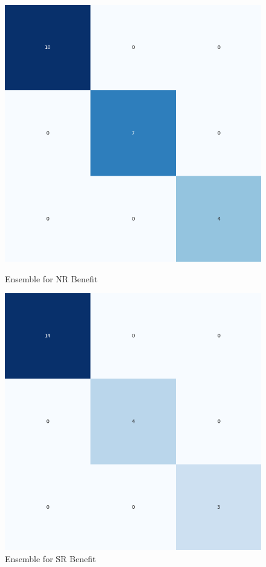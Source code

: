 \begin{figure}[H]
    \centering
    \begin{minipage}[b]{0.45\textwidth}
        \includegraphics[width=\textwidth]{./class_specific_section/ensemble_plots/ensemble_confusion_matrix_NR_Benefit.png}
        \caption{Ensemble for NR Benefit}
        \label{fig_class:spec_ensemble_nr_benefit}
    \end{minipage}
    \hfill
    \begin{minipage}[b]{0.45\textwidth}
        \includegraphics[width=\textwidth]{./class_specific_section/ensemble_plots/ensemble_confusion_matrix_SR_Benefit.png}
        \caption{Ensemble for SR Benefit}
        \label{fig_class:spec_ensemble_sr_benefit}
    \end{minipage}
\end{figure}

